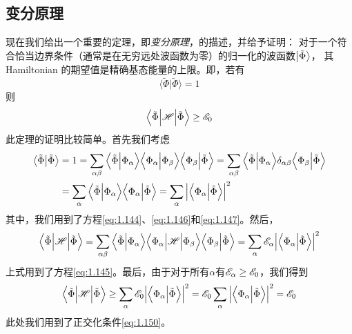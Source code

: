 \subsection{变分原理}
\label{sec:1.3.1}
现在我们给出一个重要的定理，即\emph{变分原理}，的描述，并给予证明：
对于一个符合恰当边界条件（通常是在无穷远处波函数为零）的归一化的波函数$\Ket{\tilde\Phi}$，
其 Hamiltonian 的期望值是精确基态能量的上限。即，若有
\begin{equation}
 \Big\langle\tilde\Phi\Big\vert\tilde\Phi\Big\rangle = 1
 \label{eq:1.148}
\end{equation}
则
\begin{equation}
 \Big\langle\tilde\Phi\Big\vert\mathscr{H}\Big\vert\tilde\Phi\Big\rangle \geq \mathscr{E}_0
 \label{eq:1.149}
\end{equation}
此定理的证明比较简单。首先我们考虑
\begin{equation}
 \begin{split}
     \left\langle \tilde\Phi \middle\vert \tilde\Phi \right\rangle &= 1 = \sum_{\alpha\beta}\Big\langle\tilde\Phi\Big\vert\Phi_\alpha\Big\rangle\Big\langle\Phi_\alpha\Big\vert\Phi_\beta\Big\rangle\Big\langle\Phi_\beta\Big\vert\tilde\Phi\Big\rangle = \sum_{\alpha\beta} \Big\langle\tilde\Phi\Big\vert\Phi_\alpha\Big\rangle\delta_{\alpha\beta}\Big\langle\Phi_\beta\Big\vert\tilde\Phi\Big\rangle \\
     &= \sum_\alpha \Big\langle\tilde\Phi\Big\vert\Phi_\alpha\Big\rangle\Big\langle\Phi_\alpha\Big\vert\tilde\Phi\Big\rangle = \sum_\alpha \Big\vert\Big\langle\Phi_\alpha\Big\vert\tilde\Phi\Big\rangle\Big\vert^2
 \end{split}
 \label{eq:1.150}
\end{equation}
其中，我们用到了方程\eqref{eq:1.144}、\eqref{eq:1.146}和\eqref{eq:1.147}。然后，
\begin{equation}
 \Big\langle\tilde\Phi\Big\vert\mathscr{H}\Big\vert\tilde\Phi\Big\rangle = \sum_{\alpha\beta}\Big\langle\tilde\Phi\Big\vert\Phi_\alpha\Big\rangle\Big\langle\Phi_\alpha\Big\vert\mathscr{H}\Big\vert\Phi_\beta\Big\rangle\Big\langle\Phi_\beta\Big\vert\tilde\Phi\Big\rangle = \sum_\alpha \mathscr{E}_\alpha \Big\vert\Big\langle\Phi_\alpha\Big\vert\tilde\Phi\Big\rangle\Big\vert^2
 \label{eq:1.151}
\end{equation}
上式用到了方程\eqref{eq:1.145}。最后，由于对于所有$\alpha$有$\mathscr{E}_\alpha \geq \mathscr{E}_0$，我们得到
\begin{equation}
 \Big\langle\tilde\Phi\Big\vert\mathscr{H}\Big\vert\tilde\Phi\Big\rangle \geq \sum_\alpha \mathscr{E}_0\Big\vert\Big\langle\Phi_\alpha\Big\vert\tilde\Phi\Big\rangle\Big\vert^2 = \mathscr{E}_0\sum_\alpha \Big\vert\Big\langle\Phi_\alpha\Big\vert\tilde\Phi\Big\rangle\Big\vert^2 = \mathscr{E}_0
 \label{eq:1.152}
\end{equation}
此处我们用到了正交化条件\eqref{eq:1.150}。

